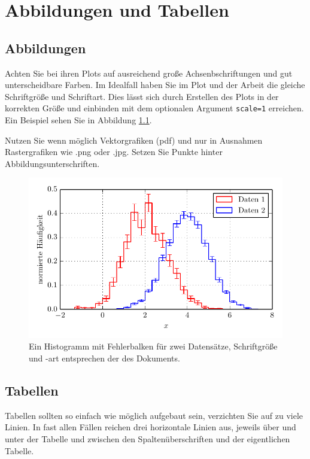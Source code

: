 \chapter{Abbildungen und Tabellen}

\section{Abbildungen}

Achten Sie bei ihren Plots auf ausreichend große Achsenbschriftungen und gut unterscheidbare Farben.
Im Idealfall haben Sie im Plot und der Arbeit die gleiche Schriftgröße und Schriftart.
Dies lässt sich durch Erstellen des Plots in der korrekten Größe und einbinden mit dem optionalen Argument \texttt{scale=1} erreichen. Ein Beispiel sehen Sie in Abbildung \ref{fig:bsp}.

Nutzen Sie wenn möglich Vektorgrafiken (pdf) und nur in Ausnahmen Rastergrafiken wie .png oder .jpg.
Setzen Sie Punkte hinter Abbildungsunterschriften.

\begin{figure}[!h]
    \centering
    \includegraphics[scale=1]{./Plots/Histogramm.pdf}
    \caption{Ein Histogramm mit Fehlerbalken für zwei Datensätze, Schriftgröße und -art entsprechen der des Dokuments.}
    \label{fig:bsp}
\end{figure}

\section{Tabellen}

Tabellen sollten so einfach wie möglich aufgebaut sein, verzichten Sie auf zu viele Linien. In fast allen Fällen reichen drei horizontale Linien aus, jeweils über und unter der Tabelle und zwischen den Spaltenüberschriften und der eigentlichen Tabelle.

